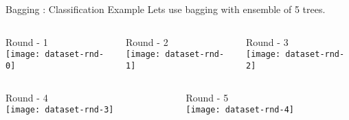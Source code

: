 \documentclass{beamer}
\begin{document}
\begin{frame}{Bagging : Classification Example}
  Lets use bagging with ensemble of 5 trees.\\
  \vspace{0.5cm}
  \begin{columns}
    \pause  \begin{column}{0.3\textwidth}
      \centering
      Round - 1\\

      \texttt{[image: dataset-rnd-0]}

    \end{column}
    \pause  \begin{column}{0.3\textwidth}
      \centering
      Round - 2\\

      \texttt{[image: dataset-rnd-1]}

    \end{column}
    \pause  \begin{column}{0.3\textwidth}
      \centering
      Round - 3\\

      \texttt{[image: dataset-rnd-2]}

    \end{column}

  \end{columns}
  \vspace{0.5cm}
  \begin{columns}
    \pause  \begin{column}{0.3\textwidth}
      \centering
      Round - 4\\

      \texttt{[image: dataset-rnd-3]}

    \end{column}
    \pause  \begin{column}{0.3\textwidth}
      \centering
      Round - 5\\

      \texttt{[image: dataset-rnd-4]}

    \end{column}

  \end{columns}
\end{frame}
\end{document}
